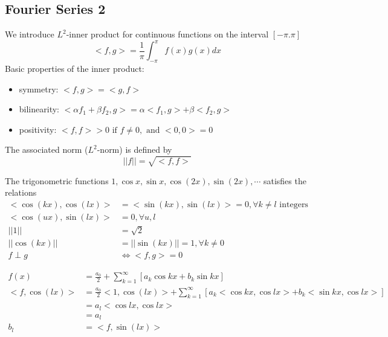 \subsection{Fourier Series 2}
We introduce $ L^2 $-inner product for continuous functions on the interval $ [-\pi.\pi] $  
$$
    <f,g>=\frac{1}{\pi}\int_{-\pi}^{\pi}f(x)g(x)dx
$$ 
Basic properties of the inner product:
\begin{itemize}
\item symmetry: $ <f,g>=<g,f> $
\item bilinearity: $ <\alpha f_1+\beta f_2,g>=\alpha<f_1,g>+\beta<f_2,g> $
\item positivity: $ <f,f> > 0 \text{ if } f\neq0 ,\text{ and } <0,0>=0 $
\end{itemize}
The associated norm ($ L^2 $-norm) is defined by $$ ||f||=\sqrt{<f,f>} $$
\begin{lemma}[]{}
The trigonometric functions $ 1,\cos{x},\sin{x},\cos(2x),\sin(2x),\cdots $ 
satisfies the relations \begin{align*}{}{}
<\cos(kx),\cos(lx)>&=<\sin(kx),\sin(lx)>=0,\forall k\neq l \text{ integers}\\
<\cos(ux),\sin(lx)>&=0,\forall u,l\\
||1||&=\sqrt{2}\\
||\cos(kx)||&=||\sin(kx)||=1,\forall k \neq0\\
f\perp g &\Leftrightarrow <f,g>=0
\end{align*}
\end{lemma}
\begin{align*}{}{}
f(x)&=\frac{a_0}{2}+\sum_{k=1}^{\infty}[a_k\cos{kx}+b_k\sin{kx}]\\
<f,\cos(lx)>&=\frac{a_0}{2}<1,\cos(lx)>+\sum_{k=1}^{\infty}[a_k<\cos{kx},\cos{lx}>+b_k<\sin{kx},\cos{lx}>]\\
&=a_l<\cos{lx},\cos{lx}>\\
&=a_l\\
b_l&=<f,\sin(lx)>
\end{align*}
